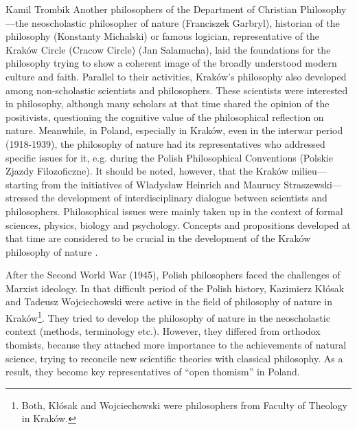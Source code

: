 \begin{artengenv}{Kamil Trombik}
Another philosophers of the Department of Christian Philosophy---the neoscholastic philosopher of nature (Franciszek
Garbryl), historian of the philosophy (Konstanty Michalski) or famous logician, representative of the Kraków Circle
(Cracow Circle) (Jan Salamucha), laid the foundations for the philosophy trying to show a coherent image of the broadly
understood modern culture and faith. Parallel to their activities, Kraków's philosophy also developed among
non-scholastic scientists and philosophers. These scientists were interested in philosophy, although many scholars at
that time shared the opinion of the positivists, questioning the cognitive value of the philosophical reflection on
nature. Meanwhile, in Poland, especially in Kraków, even in the interwar period (1918-1939), the philosophy of nature
had its representatives who addressed specific issues for it, e.g. during the Polish Philosophical Conventions (Polskie
Zjazdy Filozoficzne). It should be noted, however, that the Kraków milieu---starting from the initiatives of Władysław
Heinrich and Maurucy Straszewski---stressed the development of interdisciplinary dialogue between scientists and
philosophers. Philosophical issues were mainly taken up in the context of formal sciences, physics, biology and
psychology. Concepts and propositions developed at that time are considered to be crucial in the development of the
Kraków philosophy of nature
\parencite{heller_krakowska_2007,dziedzic_historia_2007,polak_tradycja_2018}.

After the Second World War (1945), Polish philosophers faced the challenges of Marxist ideology. In that difficult
period of the Polish history, Kazimierz Kłósak and Tadeusz Wojciechowski were active in the field of philosophy of
nature in Kraków\footnote{Both, Kłósak and Wojciechowski were philosophers from Faculty of Theology in Kraków. }. They
tried to develop the philosophy of nature in the neoscholastic context (methods, terminology etc.). However, they
differed from orthodox thomists, because they attached more importance to the achievements of natural science, trying
to reconcile new scientific theories with classical philosophy. As a result, they become key representatives of ``open
thomism'' in Poland.


\end{artengenv}
